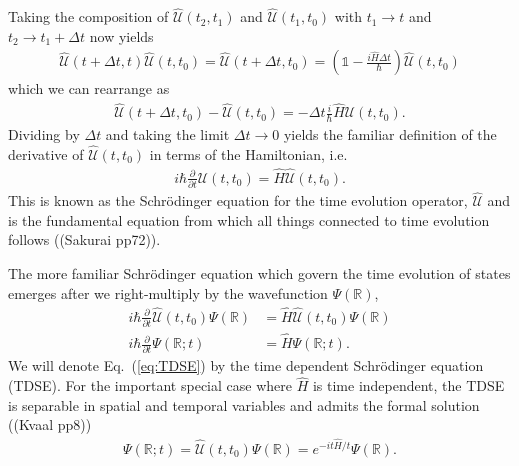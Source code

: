 \documentclass[a4paper]{article}
\newcommand{\pder}[2]{\frac{\partial   #1}{\partial   #2}}   %
\newcommand{\R}{\mathbb{R}}
\newcommand{\eq} [1]{Eq.\ (\ref{eq:#1})}
\newcommand{\nn}{\nonumber}
\begin{document}
Taking the composition of $\hat{\mathcal{U}}(t_2,t_1)$ and $\hat{\mathcal{U}}(t_1,t_0)$ with $t_1\rightarrow t$ and $t_2\rightarrow t_1+\Delta t$ now yields
\begin{align}
\hat{\mathcal{U}}(t+\Delta t,t)\hat{\mathcal{U}}(t,t_0) = \hat{\mathcal{U}}(t+\Delta t, t_0) = \left(\mathds{1} - \frac{i\hat H \Delta t}{\hbar} \right) \hat{\mathcal{U}}(t,t_0)
\end{align}
which we can rearrange as 
\begin{align}
\hat{\mathcal{U}}(t+\Delta t,t_0) - \hat{\mathcal{U}}(t,t_0) = -\Delta t \frac{i}{\hbar} \hat H \hat{\mathcal{U}}(t,t_0).
\end{align}
Dividing by $\Delta t$ and taking the limit $\Delta t\rightarrow 0$ yields the familiar definition of the derivative of $\hat{\mathcal{U}}(t,t_0)$ in terms of the Hamiltonian, i.e.
\begin{align}
i\hbar \pder{}{t} \hat{\mathcal{U}}(t,t_0) = \hat H \hat{\mathcal{U}}(t,t_0).
\end{align}
This is known as the Schrödinger equation for the time evolution operator, $\hat{\mathcal{U}}$ and is the fundamental equation from which all things connected to time evolution follows ((Sakurai pp72)). 

The more familiar Schrödinger equation which govern the time evolution of states emerges after we right-multiply by the wavefunction $\Psi(\R)$,
\begin{align}
i\hbar \pder{}{t}\hat{\mathcal{U}}(t,t_0)\Psi(\R) &= \hat H \hat{\mathcal{U}}(t,t_0) \Psi(\R) \nn\\
%
i\hbar \pder{}{t} \Psi(\R;t) &= \hat H \Psi(\R;t). \label{eq:TDSE}
\end{align}
We will denote \eq{TDSE} by the time dependent Schrödinger equation (TDSE). For the important special case where $\hat H$ is time independent, the TDSE is separable in spatial and temporal variables and admits the formal solution ((Kvaal pp8))
\begin{align}
\Psi(\R;t) = \hat{\mathcal{U}}(t,t_0) \Psi(\R) = e^{-it\hat H/t}\Psi(\R). \label{eq:QM10}
\end{align}
\end{document}
